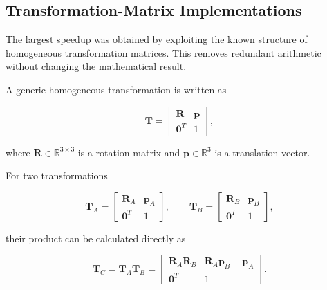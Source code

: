 \subsection{Transformation-Matrix Implementations}

The largest speedup was obtained by exploiting the known structure of homogeneous transformation matrices. This removes redundant arithmetic without changing the mathematical result.

A generic homogeneous transformation is written as

\begin{equation}
    \mathbf{T} =
    \begin{bmatrix}
        \mathbf{R} & \mathbf{p} \\
        \mathbf{0}^{T} & 1
    \end{bmatrix},
    \label{eq:homogeneous_structure}
\end{equation}

where \(\mathbf{R} \in \mathbb{R}^{3 \times 3}\) is a rotation matrix and \(\mathbf{p} \in \mathbb{R}^{3}\) is a translation vector.

For two transformations

\begin{equation}
    \mathbf{T}_{A} =
    \begin{bmatrix}
        \mathbf{R}_{A} & \mathbf{p}_{A} \\
        \mathbf{0}^{T} & 1
    \end{bmatrix},
    \qquad
    \mathbf{T}_{B} =
    \begin{bmatrix}
        \mathbf{R}_{B} & \mathbf{p}_{B} \\
        \mathbf{0}^{T} & 1
    \end{bmatrix},
    \label{eq:two_homogeneous_transforms}
\end{equation}

their product can be calculated directly as

\begin{equation}
    \mathbf{T}_{C} =
    \mathbf{T}_{A}\mathbf{T}_{B}
    =
    \begin{bmatrix}
        \mathbf{R}_{A}\mathbf{R}_{B}
        &
        \mathbf{R}_{A}\mathbf{p}_{B}
        +
        \mathbf{p}_{A}
        \\
        \mathbf{0}^{T}
        &
        1
    \end{bmatrix}.
    \label{eq:optimized_homogeneous_product}
\end{equation}

